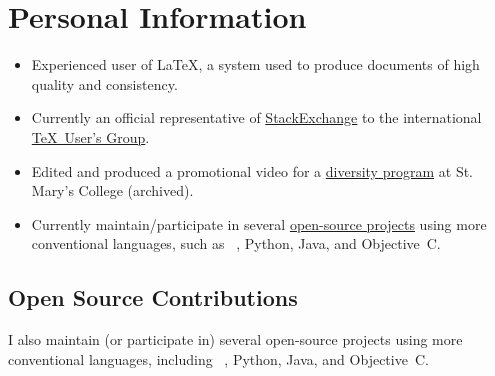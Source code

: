 \documentclass{simplecv}
\begin{document}
\section{Personal Information}
\begin{itemize}
\item Experienced user of \LaTeX, a system used to produce documents
  of high quality and consistency.
\item Currently an official representative of
  \href{http://meta.tex.stackexchange.com/a/4174/17423}{StackExchange}
  to the international \href{http://www.tug.org}{\TeX\ User's Group}.
\item Edited and produced a promotional video for a \href{http://www.smcm.edu/desousabrent}{diversity program} at St. Mary's College (archived).
\item Currently maintain\slash participate in several
  \href{http://www.github.com/vermiculus}{open-source projects}
  using more conventional languages, such as
  ~\Lisp, Python, Java, and Objective~C.
\end{itemize}
\vfill
\comment
\subsection{Open Source Contributions \hfill {}}

I also maintain (or participate in) several open-source projects
  using more conventional languages,
  including ~\Lisp, Python, Java, and Objective~C.




\end{document}
